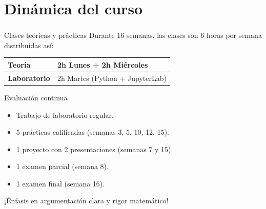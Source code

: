 \section{Dinámica del curso}

\begin{frame}
	\frametitle{\insertsection}

	\begin{block}{Clases teóricas y prácticas}
		Durante 16 semanas, las clases son 6 horas por semana distribuidas así:
		\begin{table}[ht!]
			\centering
			\begin{tabular}{|l|l|}
				\hline
				\textbf{Teoría}      & 2h Lunes + 2h Miércoles         \\[0.1cm]
				\hline
				\textbf{Laboratorio} & 2h Martes (Python + JupyterLab) \\
				\hline
			\end{tabular}
		\end{table}
	\end{block}

	\begin{block}{Evaluación continua}
		\begin{itemize}
			\item Trabajo de laboratorio regular.

			\item 5 prácticas calificadas (semanas 3, 5, 10, 12, 15).

			\item 1 proyecto con 2 presentaciones (semanas 7 y 15).

			\item 1 examen parcial (semana 8).

			\item 1 examen final (semana 16).
		\end{itemize}
		\small ¡Énfasis en argumentación clara y rigor matemático!
	\end{block}
\end{frame}
